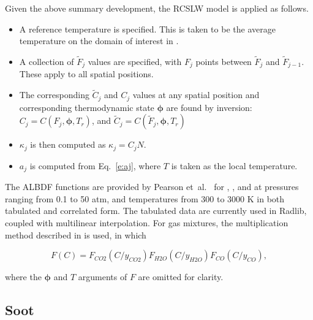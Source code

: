 \documentclass[preprint,12pt, a4paper]{elsarticle}
\newcommand{\BS}{\boldsymbol}
\begin{document}
Given the above summary development, the RCSLW model is applied as follows. 
%
\begin{itemize}
    \item A reference temperature is specified. This is taken to be the average temperature on the domain of interest in \cite{Solovjov_2001}.
    \item A collection of $\tilde{F}_j$ values are specified, with $F_j$ points between $\tilde{F}_j$ and $\tilde{F}_{j-1}$. These apply to all spatial positions. 
    \item The corresponding $\tilde{C}_j$ and $C_j$ values at any spatial position and corresponding thermodynamic state $\BS{\phi}$ are found by inversion: $C_j = C(F_j,\BS{\phi},T_r)$, and $\tilde{C}_j = C(\tilde{F}_j,\BS{\phi},T_r)$
    \item $\kappa_j$ is then computed as $\kappa_j=C_jN$. 
    \item $a_j$ is computed from Eq.~\ref{e:aj}, where $T$ is taken as the local temperature.
\end{itemize}
%

The ALBDF functions are provided by Pearson et~al.~\cite{Pearson_2014} for , , and  at pressures ranging from 0.1 to 50 atm, and temperatures from 300 to 3000 K in both tabulated and correlated form. The tabulated data are currently used in Radlib, coupled with multilinear interpolation. For gas mixtures, the multiplication method described in \cite{Solovjov_2000} is used, in which 
%
\begin{linenomath}
\begin{equation}
    F(C) = F_{CO2}(C/y_{CO2})F_{H2O}(C/y_{H2O})F_{CO}(C/y_{CO}), 
\end{equation}
\end{linenomath}
%
where the $\BS{\phi}$ and $T$ arguments of $F$ are omitted for clarity.


\subsection{Soot} \label{s:soot}
\end{document}
